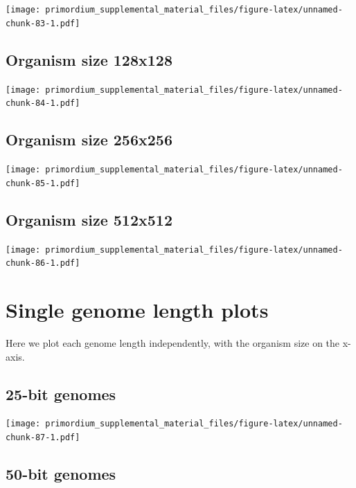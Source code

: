 \documentclass[
]{book}
\begin{document}
\texttt{[image: primordium\_supplemental\_material\_files/figure-latex/unnamed-chunk-83-1.pdf]}

\hypertarget{organism-size-128x128-2}{%
\subsection{Organism size 128x128}\label{organism-size-128x128-2}}

\texttt{[image: primordium\_supplemental\_material\_files/figure-latex/unnamed-chunk-84-1.pdf]}

\hypertarget{organism-size-256x256-2}{%
\subsection{Organism size 256x256}\label{organism-size-256x256-2}}

\texttt{[image: primordium\_supplemental\_material\_files/figure-latex/unnamed-chunk-85-1.pdf]}

\hypertarget{organism-size-512x512-2}{%
\subsection{Organism size 512x512}\label{organism-size-512x512-2}}

\texttt{[image: primordium\_supplemental\_material\_files/figure-latex/unnamed-chunk-86-1.pdf]}

\hypertarget{single-genome-length-plots}{%
\section{Single genome length plots}\label{single-genome-length-plots}}

Here we plot each genome length independently, with the organism size on the x-axis.

\hypertarget{bit-genomes}{%
\subsection{25-bit genomes}\label{bit-genomes}}

\texttt{[image: primordium\_supplemental\_material\_files/figure-latex/unnamed-chunk-87-1.pdf]}

\hypertarget{bit-genomes-1}{%
\subsection{50-bit genomes}\label{bit-genomes-1}}
\end{document}
